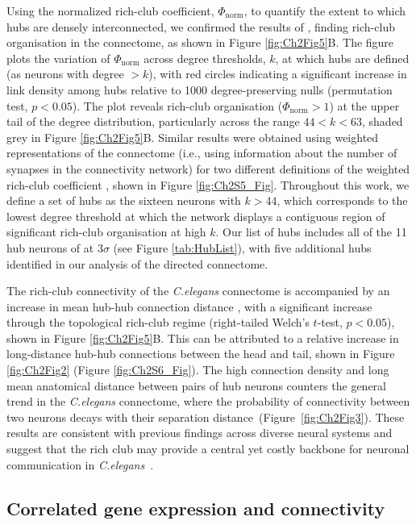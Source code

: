 Using the normalized rich-club coefficient, $\Phi_\mathrm{norm}$, to quantify the extent to which hubs are densely interconnected, we confirmed the results of  
\citet{Towlson2013}, finding rich-club organisation in the connectome, as shown in Figure \ref{fig:Ch2Fig5}B.
The figure plots the variation of $\Phi_\mathrm{norm}$ across degree thresholds, $k$, at which hubs are defined (as neurons with degree $>k$), with red circles indicating a significant increase in link density among hubs relative to 1000 degree-preserving nulls (permutation test, $p < 0.05$).
The plot reveals rich-club organisation ($\Phi_\mathrm{norm} > 1$) at the upper tail of the degree distribution, particularly across the range $44 < k < 63$, shaded grey in Figure \ref{fig:Ch2Fig5}B.
Similar results were obtained using weighted representations of the connectome (i.e., using information about the number of synapses in the connectivity network) for two different definitions of the weighted rich-club coefficient \citep{Opsahl2008}, shown in Figure \ref{fig:Ch2S5_Fig}.
Throughout this work, we define a set of hubs as the sixteen neurons with $k > 44$, which corresponds to the lowest degree threshold at which the network displays a contiguous region of significant rich-club organisation at high $k$.
Our list of hubs includes all of the 11 hub neurons of \citet{Towlson2013} at $3 \sigma$ (see Figure \ref{tab:HubList}), with five additional hubs identified in our analysis of the directed connectome.

The rich-club connectivity of the \emph{C.elegans} connectome is accompanied by an increase in mean hub-hub connection distance \citep{Towlson2013}, with a significant increase through the topological rich-club regime (right-tailed Welch's $t$-test, $p < 0.05$), shown in Figure \ref{fig:Ch2Fig5}B.
This can be attributed to a relative increase in long-distance hub-hub connections between the head and tail, shown in Figure \ref{fig:Ch2Fig2} (Figure  \ref{fig:Ch2S6_Fig}).
The high connection density and long mean anatomical distance between pairs of hub neurons counters the general trend in the \emph{C.elegans} connectome, where the probability of connectivity between two neurons decays with their separation \mbox{distance (Figure \ref{fig:Ch2Fig3})}.
These results are consistent with previous findings across diverse neural systems and suggest that the rich club may provide a central yet costly backbone for neuronal communication in \mbox{\emph{C.elegans} \citep{VandenHeuvel2012, Towlson2013}}.

\subsection{Correlated gene expression and connectivity}

